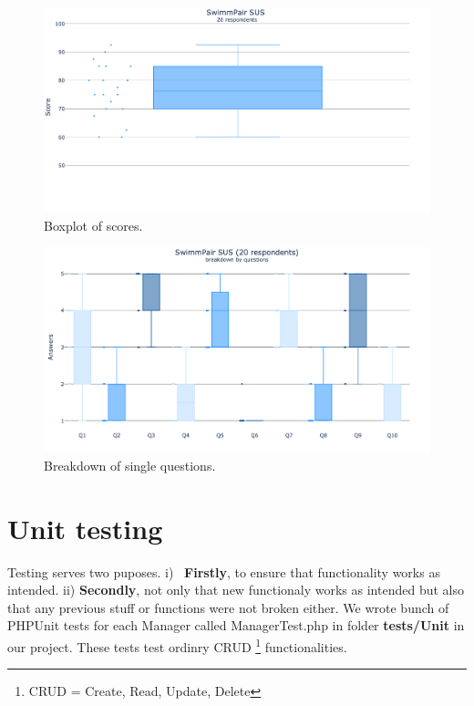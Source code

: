 \begin{figure}[h]	
    \centering	
    \includegraphics[scale=0.257]{img/sus_general.png}
    \caption{Boxplot of scores.}
    \label{fig4.1:susgeneral}
\end{figure}

\begin{figure}[h]	
    \centering	
    \includegraphics[scale=0.256]{img/sus_breakdown.png}
    \caption{Breakdown of single questions.}
    \label{fig4.2:susbreakdown}
\end{figure}
\newpage
\section{Unit testing}
Testing serves two puposes.
\newline i) \, \textbf{Firstly}, to ensure that functionality works as intended.
\newline ii) \textbf{Secondly}, not only that new functionaly works as intended but also that any previous stuff or functions were not broken either.  
\newline
We wrote bunch of PHPUnit tests for each Manager called ManagerTest.php in folder \textbf{tests/Unit} in our project. These tests test ordinry CRUD \footnote{CRUD = Create, Read, Update, Delete} functionalities.
